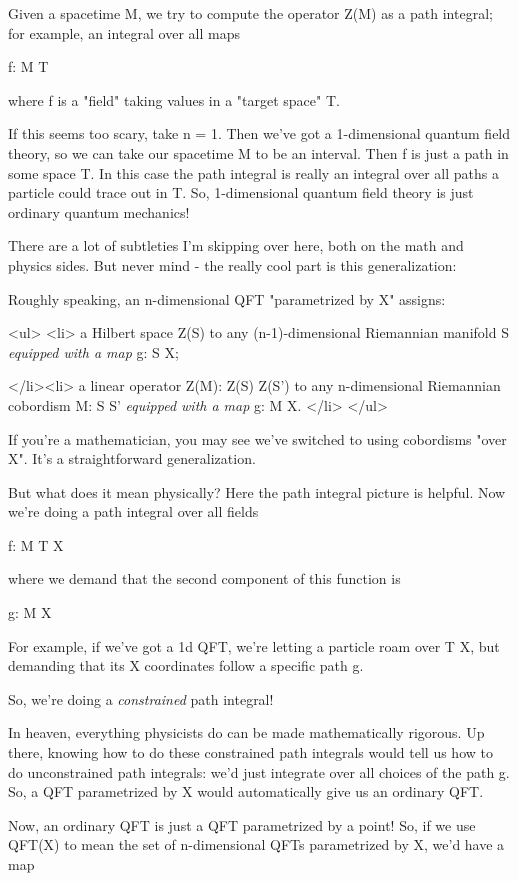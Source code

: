 Given a spacetime M, we try to compute the operator Z(M) as 
a path integral; for example, an integral over all maps

f: M \to  T

where f is a "field" taking values in a "target
space" T.

If this seems too scary, take n = 1.  Then we've got a 
1-dimensional quantum field theory, so we can take our 
spacetime M to be an interval.   Then f is just a path in some 
space T.  In this case the path integral is really an integral 
over all paths a particle could trace out in T.  So, 1-dimensional 
quantum field theory is just ordinary quantum mechanics!

There are a lot of subtleties I'm skipping over here, both on
the math and physics sides.   But never mind - the really cool 
part is this generalization:

Roughly speaking, an n-dimensional QFT "parametrized by X" 
assigns:

<ul>
<li>
 a Hilbert space Z(S) to any (n-1)-dimensional Riemannian 
 manifold S \emph{equipped with a map} g: S \to  X; 

</li><li>
 a linear operator Z(M): Z(S) \to  Z(S') to any n-dimensional 
 Riemannian cobordism M: S \to  S' \emph{equipped with a map} 
g: M \to  X.
</li>
</ul>

If you're a mathematician, you may see we've switched to using 
cobordisms "over X".  It's a straightforward generalization.

But what does it mean physically?  Here the path integral picture
is helpful.  Now we're doing a path integral over all fields

f: M \to  T \times  X

where we demand that the second component of this function is

g: M \to  X

For example, if we've got a 1d QFT, we're letting a particle 
roam over T \times  X, but demanding that its X coordinates follow 
a specific path g.  

So, we're doing a \emph{constrained} path integral!

In heaven, everything physicists do can be made mathematically 
rigorous.  Up there, knowing how to do these constrained path 
integrals would tell us how to do unconstrained path integrals: 
we'd just integrate over all choices of the path g.  So, a QFT 
parametrized by X would automatically give us an ordinary QFT.

Now, an ordinary QFT is just a QFT parametrized by a point!  
So, if we use QFT(X) to mean the set of n-dimensional QFTs 
parametrized by X, we'd have a map 

